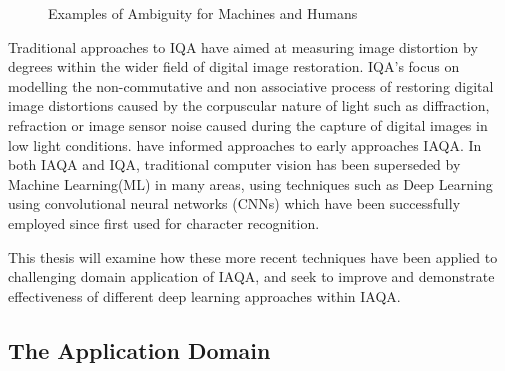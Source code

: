 \begin{figure}[h!]
    \centering
    \caption{Examples of Ambiguity for Machines and Humans}
    \label{fig:vase_face}
\end{figure}

\par

Traditional approaches to IQA have aimed at measuring image distortion by degrees\cite{gonzalez2008digital} within the wider field of digital image restoration. IQA's focus on modelling the non-commutative and non associative process of restoring digital image distortions caused by the corpuscular nature of light such as diffraction, refraction or image sensor noise caused during the capture of digital images in low light conditions.\cite{szeliski2011computer,gonzalez2008digital} have informed approaches to early approaches IAQA. In both IAQA and IQA, traditional computer vision has been superseded by Machine Learning(ML) in many areas, using techniques such as Deep Learning using convolutional neural networks (CNNs) which have been successfully employed since first used for character recognition\cite{LeCun1989,LeCun1998}.  \par
This thesis will examine how these more recent techniques have been applied to challenging domain application of IAQA, and seek to improve and  demonstrate effectiveness of different deep learning approaches within IAQA.

\newpage


\subsection{The Application Domain}

